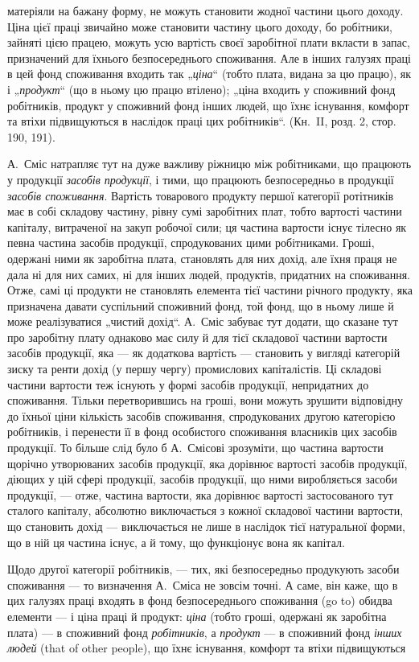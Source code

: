 \parcont{}  %
матеріяли на бажану форму, не можуть становити жодної частини цього
доходу. Ціна цієї праці звичайно може становити частину цього доходу,
бо робітники, зайняті цією працею, можуть усю вартість своєї заробітної
плати вкласти в запас, призначений для їхнього безпосереднього споживання.
Але в інших галузях праці в цей фонд споживання входить так
„\emph{ціна}“ (тобто плата, видана за цю працю), як і „\emph{продукт}“ (що в
ньому цю працю втілено); „ціна входить у споживний фонд робітників,
продукт у споживний фонд інших людей, що їхнє існування, комфорт
та втіхи підвищуються в наслідок праці цих робітників“. (Кн.~II, розд. 2,
стор. 190, 191).

А.~Сміс натрапляє тут на дуже важливу ріжницю між робітниками,
що працюють у продукції \emph{засобів продукції}, і тими, що працюють
безпосередньо в продукції \emph{засобів споживання}. Вартість
товарового продукту першої категорії ротітників має в собі складову
частину, рівну сумі заробітних плат, тобто вартості частини капіталу,
витраченої на закуп робочої сили; ця частина вартости існує тілесно як
певна частина засобів продукції, спродукованих цими робітниками. Гроші,
одержані ними як заробітна плата, становлять для них дохід, але їхня
праця не дала ні для них самих, ні для інших людей, продуктів, придатних
на споживання. Отже, самі ці продукти не становлять елемента
тієї частини річного продукту, яка призначена давати суспільний споживний
фонд, той фонд, що в ньому лише й може реалізуватися „чистий
дохід“. А.~Сміс забуває тут додати, що сказане тут про заробітну
плату однаково має силу й для тієї складової частини вартости засобів
продукції, яка — як додаткова вартість — становить у вигляді категорій
зиску та ренти дохід (у першу чергу) промислових капіталістів. Ці складові
частини вартости теж існують у формі засобів продукції, непридатних
до споживання. Тільки перетворившись на гроші, вони можуть
зрушити відповідну до їхньої ціни кількість засобів споживання, спродукованих
другою категорією робітників, і перенести її в фонд особистого
споживання власників цих засобів продукції. То більше слід було б
А.~Смісові зрозуміти, що частина вартости щорічно утворюваних засобів
продукції, яка дорівнює вартості засобів продукції, діющих у цій сфері
продукції, засобів продукції, що ними виробляється засоби продукції, —
отже, частина вартости, яка дорівнює вартості застосованого тут сталого
капіталу, абсолютно виключається з кожної складової частини вартости,
що становить дохід — виключається не лише в наслідок тієї натуральної
форми, що в ній ця частина існує, а й тому, що функціонує вона як
капітал.

Щодо другої категорії робітників, — тих, які безпосередньо продукують
засоби споживання — то визначення А.~Сміса не зовсім точні.
А саме, він каже, що в цих галузях праці входять в фонд безпосереднього
споживання (go to) обидва елементи — і ціна праці й продукт:
\emph{ціна} (тобто гроші, одержані як заробітна плата) — в споживний фонд
\emph{робітників}, а \emph{продукт} — в споживний фонд \emph{інших людей}
(that of other people), що їхнє існування, комфорт та втіхи підвищуються
\parbreak{}  %
